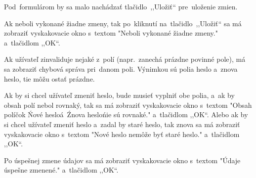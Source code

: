 Pod~formulárom by sa malo nachádzať tlačidlo~,,Uložiť`` pre~uloženie zmien.

Ak neboli vykonané žiadne zmeny, tak po~kliknutí na~tlačidlo~,,Uložiť`` sa má zobraziť vyskakovacie okno s~textom "Neboli vykonané žiadne zmeny." a~tlačidlom ,,OK``.

Ak užívateľ zinvaliduje nejaké z~polí (napr.~zanechá prázdne povinné pole), má sa zobraziť chybová správa pri~danom poli. Výnimkou sú polia heslo a~znova heslo, tie môžu ostať prázdne. 

Ak by si chcel užívateľ zmeniť heslo, bude musieť vyplniť obe polia, a~ak by obsah polí nebol rovnaký, tak sa má zobraziť vyskakovacie okno s~textom "Obsah políčok \'Nové heslo\' a~\'Znova heslo\' nie sú rovnaké." a~tlačidlom ,,OK``. Alebo ak by si chcel užívateľ zmeniť heslo a~zadal by staré heslo, tak znova sa má zobraziť vyskakovacie okno s~textom "Nové heslo nemôže byť staré heslo." a~tlačidlom ,,OK``.

Po úspešnej zmene údajov sa má zobraziť vyskakovacie okno s~textom "Údaje úspešne zmenené." a~tlačidlom ,,OK``.

